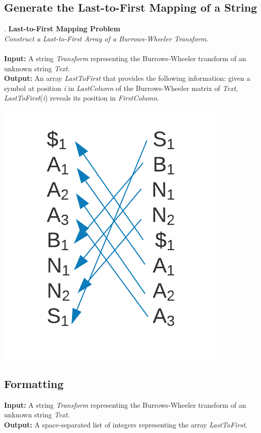 \documentclass{article}
\begin{document}
\subsection{Generate the Last-to-First Mapping of a String}.
\hline\vspace{5}
\noindent\textbf{Last-to-First Mapping Problem}\\
\emph{Construct a Last-to-First Array of a Burrows-Wheeler Transform}.\\ \\
\textbf{Input:} A string \emph{Transform} representing the Burrows-Wheeler transform of an unknown string \emph{Text}. \\
\textbf{Output:} An array \emph{LastToFirst} that provides the following information: given a symbol at position \emph{i} in \emph{LastColumn} of the Burrows-Wheeler matrix of \emph{Text}, \emph{LastToFirst}(\emph{i}) reveals its position in \emph{FirstColumn}.
\begin{center}
    \includegraphics[scale=0.2]{c9/logos/9K.png} 
\end{center}
\hline\vspace{5}

\subsection*{Formatting}
\textbf{Input:} A string \emph{Transform} representing the Burrows-Wheeler transform of an unknown string \emph{Text}.\\
\noindent\textbf{Output:} A space-separated list of integers representing the array \emph{LastToFirst}.
\end{document}
